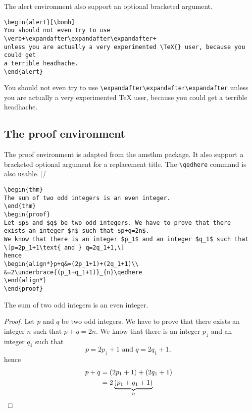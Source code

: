 \documentclass[english,ColorTheme=Red,FontSize=10pt]{tango}
\newcommand\TO[1]{\textsf{#1}}
\begin{document}
The \TO{alert} environment also support an optional bracketed argument.
\begin{tcolorbox}
\begin{verbatim}
\begin{alert}[\bomb]
You should not even try to use \verb+\expandafter\expandafter\expandafter+
unless you are actually a very experimented \TeX{} user, because you could get 
a terrible headhache.
\end{alert}
\end{verbatim}
\end{tcolorbox}
\begin{alert}[\bomb]
 You should not even try to use \verb+\expandafter\expandafter\expandafter+
unless you are actually a very experimented \TeX{} user, because you could get 
a terrible headhache.
\end{alert}

\subsection{The proof environment}
The \TO{proof} environment is adapted from the \TO{amsthm} package. It also support a bracketed optional argument for a replacement title. The \verb+\qedhere+ command is also usable.
[\itshape]
\setcounter{thm}{0}
\begin{tcolorbox}
\begin{verbatim}
\begin{thm}
The sum of two odd integers is an even integer.
\end{thm}
\begin{proof}
Let $p$ and $q$ be two odd integers. We have to prove that there
exists an integer $n$ such that $p+q=2n$.
We know that there is an integer $p_1$ and an integer $q_1$ such that
\[p=2p_1+1\text{ and } q=2q_1+1,\]
hence
\begin{align*}p+q&=(2p_1+1)+(2q_1+1)\\
&=2\underbrace{(p_1+q_1+1)}_{n}\qedhere
\end{align*}
\end{proof}
\end{verbatim}
\end{tcolorbox}
\begin{thm}
The sum of two odd integers is an even integer.
\end{thm}
\begin{proof}
Let $p$ and $q$ be two odd integers. We have to prove that there exists an integer $n$ such that $p+q=2n$.
We know that there is an integer $p_1$ and an integer $q_1$ such that
\[p=2p_1+1\text{ and } q=2q_1+1,\]
hence
\begin{align*}p+q&=(2p_1+1)+(2q_1+1)\\
&=2\underbrace{(p_1+q_1+1)}_{n}\qedhere
\end{align*}
\end{proof}
\end{document}
